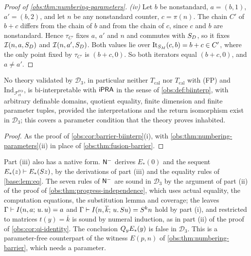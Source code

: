 \begin{proof}[Proof of \cref{obs:thm:numbering-parameters}]
\emph{(iv)} Let $b$ be nonstandard, $a=(b,1)$, $a'=(b,2)$, and let $n$ be any
nonstandard counter, $c=\pi(n)$. The chain $C'$ of $b+c$ differs from the chain
of $b$ and from the chain of $c$, since $c$ and $b$ are nonstandard. Hence
$\tau_{C'}$ fixes $a$, $a'$ and $n$ and commutes with $S_D$, so it fixes
$\mathcal{I}(n,a,S_D)$ and $\mathcal{I}(n,a',S_D)$. Both values lie over
$\operatorname{It}_{S_M}(c,b)=b+c\in C'$, where the only point fixed by
$\tau_{C'}$ is $(b+c,0)$. So both iterators equal $(b+c,0)$, and $a\ne a'$.
\end{proof}

\begin{corollary}
\label{obs:cor:numbering-parameters}
No theory validated by $\mathcal{D}_3$, in particular neither $T_{\mathrm{cal}}$
nor $T_{\mathrm{cal}}$ with (FP) and
$\mathrm{Ind}_{\mathcal{F}^{\mathrm{FO}}_{\mathrm{ct}}}$, is bi-interpretable
with $\mathsf{iPRA}$ in the sense of \cref{obs:def:biinterp}, with arbitrary definable
domains, quotient equality, finite dimension and finite parameter tuples,
provided the interpretations and the return isomorphism exist in
$\mathcal{D}_3$; this covers a parameter condition that the theory proves
inhabited.
\end{corollary}

\begin{proof}
As the proof of \cref{obs:cor:barrier-biinterp}(i), with
\cref{obs:thm:numbering-parameters}(ii) in place of
\cref{obs:thm:fusion-barrier}.
\end{proof}

Part (iii) also has a native form. $\mathsf{N}^{-}$ derives $E_{*}(0)$ and the
sequent $E_{*}(z)\vdash E_{*}(S z)$, by the derivations of part (iii) and
the equality rules of \cref{base:lem:eq}. The seven rules of $\mathsf{N}^{-}$ are
sound in $\mathcal{D}_3$ by the argument of part (ii) of the proof of
\cref{obs:thm:progress-independence}, which uses actual equality, the
computation equations, the substitution lemma and coverage; the leaves
$\Gamma\vdash I(n,a;\,u.\,u)=a$ and
$\Gamma\vdash I(n,\overline{k};\,u.\,S u)=S^{k}n$ hold by part (i), and
 restricted to matrices $t(y)=\overline{k}$ is sound by numeral
induction, as in part (ii) of the proof of \cref{obs:cor:qi-identity}. The
conclusion $Q_{y}E_{*}(y)$ is false in $\mathcal{D}_3$. This is a
parameter-free counterpart of the witness $E(p,n)$ of
\cref{obs:thm:numbering-barrier}, which needs a parameter.

